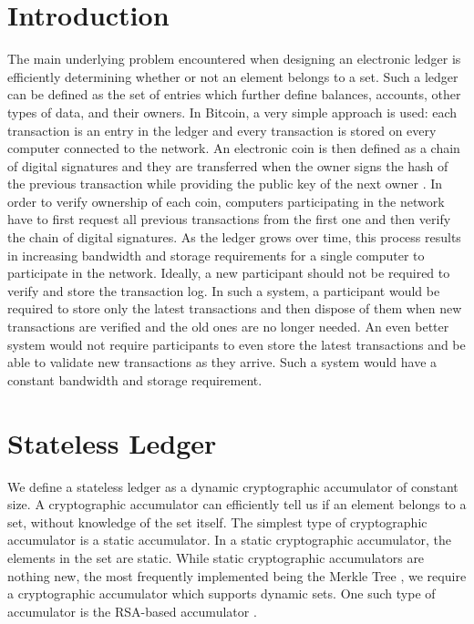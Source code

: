 \documentclass[notitlepage]{article}
\begin{document}
\section{Introduction}
The main underlying problem encountered when designing an electronic ledger is efficiently determining whether or not an element belongs to a set. Such a ledger can be defined as the set of entries which further define balances, accounts, other types of data, and their owners. In Bitcoin, a very simple approach is used: each transaction is an entry in the ledger and every transaction is stored on every computer connected to the network. An electronic coin is then defined as a chain of digital signatures and they are transferred when the owner signs the hash of the previous transaction while providing the public key of the next owner \cite{btc}. In order to verify ownership of each coin, computers participating in the network have to first request all previous transactions from the first one and then verify the chain of digital signatures. As the ledger grows over time, this process results in increasing bandwidth and storage requirements for a single computer to participate in the network. Ideally, a new participant should not be required to verify and store the transaction log. In such a system, a participant would be required to store only the latest transactions and then dispose of them when new transactions are verified and the old ones are no longer needed. An even better system would not require participants to even store the latest transactions and be able to validate new transactions as they arrive. Such a system would have a constant bandwidth and storage requirement. 

\section{Stateless Ledger}
We define a stateless ledger as a dynamic cryptographic accumulator of constant size. A cryptographic accumulator can efficiently tell us if an element belongs to a set, without knowledge of the set itself.  The simplest type of cryptographic accumulator is a static accumulator. In a static cryptographic accumulator, the elements in the set are static. While static cryptographic accumulators are nothing new, the most frequently implemented being the Merkle Tree \cite{merkle}, we require a cryptographic accumulator which supports dynamic sets. One such type of accumulator is the RSA-based accumulator \cite{ca}.
\end{document}

